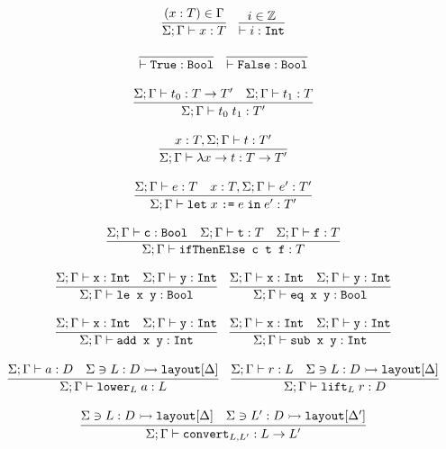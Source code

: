 \documentclass[10pt]{article}
\begin{document}
\[
  \begin{array}{c}
    \infer{\Sigma ; \Gamma \vdash x : T}{(x : T) \in \Gamma}
    ~~~
    \infer{\vdash i : \ttt{Int}}{i \in \mathbb{Z}}
    \\\\
    \infer{\vdash \ttt{True} : \ttt{Bool}}{}
    ~~~
    \infer{\vdash \ttt{False} : \ttt{Bool}}{}
    \\\\
    \infer{\Sigma ; \Gamma \vdash t_0\; t_1 : T'}{\Sigma ; \Gamma \vdash t_0 : T \ra T' & \Sigma ; \Gamma \vdash t_1 : T}
    \\\\
    \infer{\Sigma ; \Gamma \vdash \lambda x \ra t : T \ra T'}{x : T, \Sigma ; \Gamma \vdash t : T'}
    \\\\
    \infer{\Sigma ; \Gamma \vdash \letbnd\; x\; \ttt{:=}\; e\; \inexpr\; e' : T'}{\Sigma ; \Gamma \vdash e : T & x : T, \Sigma ; \Gamma \vdash e' : T'}
    \\\\
    \infer{\Sigma ; \Gamma \vdash \ttt{ifThenElse c t f} : T}{\Sigma ; \Gamma \vdash \ttt{c} : \Bool & \Sigma ; \Gamma \vdash \ttt{t} : T & \Sigma ; \Gamma \vdash \ttt{f} : T}
    \\\\
    \infer{\Sigma ; \Gamma \vdash \ttt{le x y} : \Bool}{\Sigma ; \Gamma \vdash \ttt{x} : \Int & \Sigma ; \Gamma \vdash \ttt{y} : \Int}
    ~~~
    \infer{\Sigma ; \Gamma \vdash \ttt{eq x y} : \Bool}{\Sigma ; \Gamma \vdash \ttt{x} : \Int & \Sigma ; \Gamma \vdash \ttt{y} : \Int}
    \\\\
    \infer{\Sigma ; \Gamma \vdash \ttt{add x y} : \Int}{\Sigma ; \Gamma \vdash \ttt{x} : \Int & \Sigma ; \Gamma \vdash \ttt{y} : \Int}
    ~~~
    \infer{\Sigma ; \Gamma \vdash \ttt{sub x y} : \Int}{\Sigma ; \Gamma \vdash \ttt{x} : \Int & \Sigma ; \Gamma \vdash \ttt{y} : \Int}
    \\\\
    \infer{\Sigma ; \Gamma \vdash \lowerS{L} a : L}{\Sigma ; \Gamma \vdash a : D & \Sigma \ni L : D \hra \ttt{layout}[\Delta]}
    ~~~
    \infer{\Sigma ; \Gamma \vdash \liftS{L} r : D}{\Sigma ; \Gamma \vdash r : L & \Sigma \ni L : D \hra \ttt{layout}[\Delta]}
    \\\\
    \infer{\Sigma ; \Gamma \vdash \ttt{convert}_{L,L'} : L \ra L'}
          {\Sigma \ni L : D \hra \ttt{layout}[\Delta] & \Sigma \ni L' : D \hra \ttt{layout}[\Delta']}
  \end{array}
\]
\end{document}
